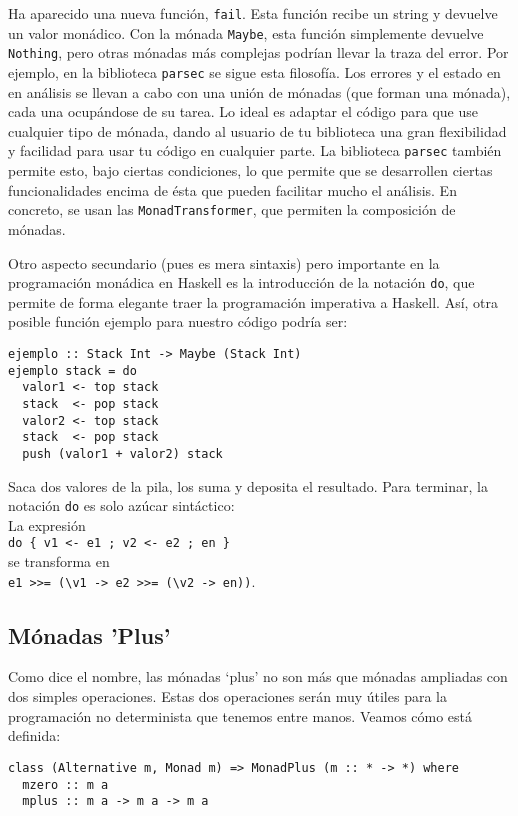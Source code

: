 \documentclass[class=article, crop=false]{standalone}
\begin{document}
Ha aparecido una nueva función, \verb`fail`. Esta función recibe un string y devuelve un
valor monádico. Con la mónada \verb`Maybe`, esta función simplemente devuelve \verb`Nothing`,
pero otras mónadas más complejas podrían llevar la traza del error. Por ejemplo, en la
biblioteca \verb`parsec` se sigue esta filosofía. Los errores y el estado en en análisis se
llevan a cabo con una unión de mónadas (que forman una mónada), cada una ocupándose de su
tarea. Lo ideal es adaptar el código para que use cualquier tipo de mónada, dando al usuario
de tu biblioteca una gran flexibilidad y facilidad para usar tu código en cualquier parte. La
biblioteca \verb`parsec` también permite esto, bajo ciertas condiciones, lo que permite que
se desarrollen ciertas funcionalidades encima de ésta que pueden facilitar mucho el análisis.
En concreto, se usan las \verb`MonadTransformer`, que permiten la composición de mónadas.

Otro aspecto secundario (pues es mera sintaxis) pero importante en la programación monádica
en Haskell es la introducción de la notación \verb`do`, que permite de forma elegante traer
la programación imperativa a Haskell. Así, otra posible función ejemplo para nuestro código
podría ser:

\begin{verbatim}
ejemplo :: Stack Int -> Maybe (Stack Int)
ejemplo stack = do
  valor1 <- top stack
  stack  <- pop stack
  valor2 <- top stack
  stack  <- pop stack
  push (valor1 + valor2) stack
\end{verbatim}

Saca dos valores de la pila, los suma y deposita el resultado. Para terminar, la notación
\verb`do` es solo azúcar sintáctico: \\
La expresión \\
\verb`do { v1 <- e1 ; v2 <- e2 ; en }` \\
se transforma en \\
\verb`e1 >>= (\v1 -> e2 >>= (\v2 -> en))`.

\subsection{Mónadas 'Plus'}
Como dice el nombre, las mónadas `plus' no son más que mónadas ampliadas con dos simples
operaciones. Estas dos operaciones serán muy útiles para la programación no determinista que
tenemos entre manos. Veamos cómo está definida:

\begin{verbatim}
class (Alternative m, Monad m) => MonadPlus (m :: * -> *) where
  mzero :: m a
  mplus :: m a -> m a -> m a
\end{verbatim}
\end{document}
